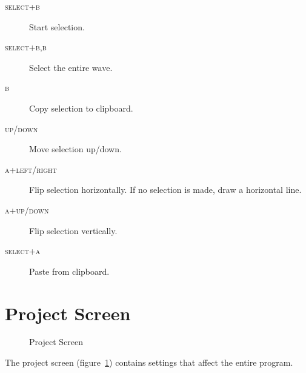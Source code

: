 \begin{description}
	\item[\textsc{select+b}] Start selection.
	\item[\textsc{select+b,b}] Select the entire wave.
	\item[\textsc{b}] Copy selection to clipboard.
	\item[\textsc{up/down}] Move selection up/down.
	\item[\textsc{a+left/right}] Flip selection horizontally. If no selection is made, draw a horizontal line.
	\item[\textsc{a+up/down}] Flip selection vertically.
	\item[\textsc{select+a}] Paste from clipboard.
\end{description}

\section{Project Screen}

\begin{figure}[htpb]
	\begin{center}
	\end{center}
	\caption{Project Screen}
	\label{fig:project}
\end{figure}

The project screen (figure~\ref{fig:project}) contains settings that affect the entire program.

